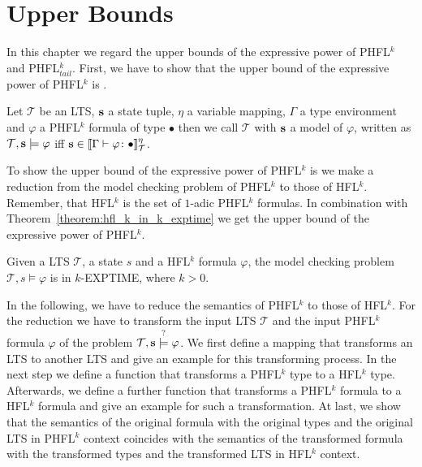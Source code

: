 
\chapter{Upper Bounds}\label{ch:upperBounds}

In this chapter we regard the upper bounds of the expressive power of PHFL$^k$ and PHFL$^k_{tail}$. First, we have to show that the upper
bound of the expressive power of PHFL$^k$ is .

\begin{definition}
    Let $\mathcal{T}$ be an LTS, $\emph{s}$ a state tuple, $\eta$ a variable mapping, $\Gamma$ a type environment and
    $\varphi$ a PHFL$^k$ formula of type $\bullet$ then we call $\mathcal{T}$ with $\emph{s}$ a model of $\varphi$,
    written as $\mathcal{T}, \emph{s} \models \varphi$ iff $\emph{s} \in \llbracket \Gamma
    \vdash \varphi \colon \bullet \rrbracket^\eta_\mathcal{T}$.
\end{definition}

To show the upper bound of the expressive power of PHFL$^k$ is  we make a reduction from the model checking
problem of PHFL$^k$ to those of HFL$^k$. Remember, that HFL$^k$ is the set of $1$-adic PHFL$^k$
formulas. In combination with Theorem~\ref{theorem:hfl_k_in_k_exptime} we get the upper bound of the expressive power of PHFL$^k$.

\begin{theorem}{\cite{axelsson2007complexity}}
    \label{theorem:hfl_k_in_k_exptime}
    Given a LTS $\mathcal{T}$, a state $s$ and a HFL$^k$ formula $\varphi$, the model checking problem $\mathcal{T}, s
    \models \varphi$ is in $k$-EXPTIME, where $k > 0$.
\end{theorem}

In the following, we have to reduce the semantics of PHFL$^k$ to those of HFL$^k$.
For the reduction we have to transform the input LTS $\mathcal{T}$ and the input PHFL$^k$ formula $\varphi$ of the problem
$\mathcal{T}, \emph{s} \overset{?}{\models} \varphi$. We first define a mapping that transforms an LTS to another
LTS and give an example for this transforming process. In the next step we define a function that transforms a
PHFL$^k$ type to a HFL$^k$ type. Afterwards, we define a further function that transforms a PHFL$^k$ formula to a
HFL$^k$ formula and give an example for such a transformation. At last, we show that the semantics of the original
formula with the original types and the original LTS in PHFL$^k$ context coincides with the semantics of the
transformed formula with the transformed types and the transformed LTS in HFL$^k$ context.


